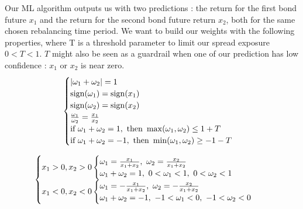 \documentclass[a4, 14pts]{seminar}
\DeclareMathOperator{\sign}{sign}
\begin{document}
	    {\small{
\begin{slide}
\slidecontents
\renewcommand\theslideheading{Plan}
\end{slide}

{\small{
\begin{slide}
Our ML algorithm outputs us with two predictions : the return for the first bond future $x_1$ and the return for the second bond
future return $x_2$, both for the same chosen rebalancing time period. We want to build our weights with the following properties, where T is a threshold parameter to limit our spread exposure $0<T<1$.
$T$ might also be seen as a guardrail when one of our prediction has low confidence : $x_1$ or $x_2$ is near zero.
\begin{equation}
\begin{displaystyle}
\begin{cases}
\left|  \omega_1 + \omega_2\right|=1\\
\sign(\omega_1) = \sign(x_1)\\
\sign(\omega_2) = \sign(x_2)\\
\frac{\omega_1}{\omega_2}=\frac{x_1}{x_2}\\
\text{if } \omega_1 + \omega_2 =1, \text{ then } \max(\omega_1,\omega_2) \leq 1+T\\
\text{if } \omega_1 + \omega_2 =-1, \text{ then } \min(\omega_1,\omega_2) \geq -1-T
\end{cases}
\end{displaystyle}
\end{equation}
\end{slide}
\begin{slide}
{\footnotesize
{}
\begin{equation}
\begin{displaystyle}
\begin{cases}
x_1 > 0, x_2 > 0 \begin{cases}  \omega_1=\frac{x_1}{x_1+x_2},\ \omega_2=\frac{x_2}{x_1+x_2}  \\ \omega_1+\omega_2=1,\ 0<\omega_1<1,\ 0<\omega_2<1    \end{cases} \\
x_1 < 0, x_2 < 0 \begin{cases}  \omega_1=-\frac{x_1}{x_1+x_2},\ \omega_2=-\frac{x_2}{x_1+x_2}  \\ \omega_1+\omega_2=-1,\ -1<\omega_1<0,\ -1<\omega_2<0    \end{cases} \\

\end{cases}
\end{displaystyle}
\end{equation}}
\end{slide}}}}}
\end{document}
